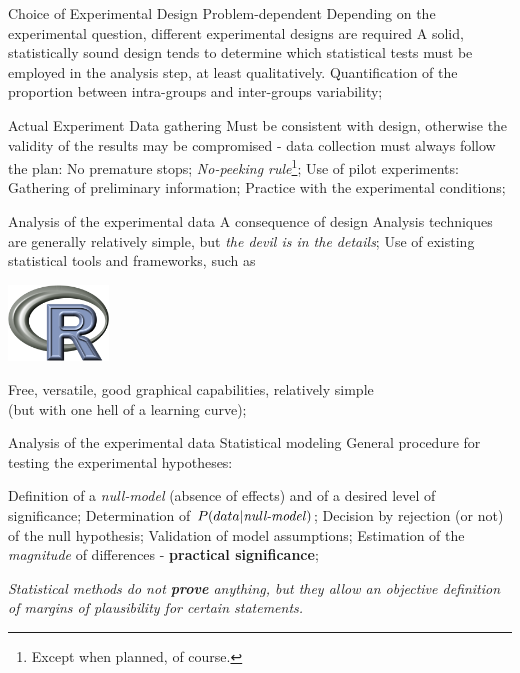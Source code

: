 \documentclass[t]{beamer}
\begin{document}

\begin{ftst}
{Choice of Experimental Design}
{Problem-dependent}
\bitems Depending on the experimental question, different experimental designs are required
	\spitem A solid, statistically sound design tends to determine which statistical tests must be employed in the analysis step, at least qualitatively.
	\spitem Quantification of the proportion between intra-groups and inter-groups variability;
\eitem
\end{ftst}

\begin{ftst}
{Actual Experiment}
{Data gathering}
\bitems Must be consistent with design, otherwise the validity of the results may be compromised - data collection must always follow the plan:\vhalf
	\bitems No premature stops;	
		\spitem\textit{No-peeking rule}\footnote[1]{Except when planned, of course.};
	\eitem
	\spitem Use of pilot experiments:\vhalf
	\bitems Gathering of preliminary information;
		\spitem Practice with the experimental conditions;
	\eitem
\eitem
\end{ftst}


\begin{ftst}
{Analysis of the experimental data}
{A consequence of design}
\bitems Analysis techniques are generally relatively simple, but \textit{the devil is in the details};
	\spitem Use of existing statistical tools and frameworks, such as
\eitem
\begin{center}
\includegraphics[width=0.2\textwidth]{../figs/rlogo.png}
\end{center}
\bitems Free, versatile, good graphical capabilities, relatively simple\\
(but with one hell of a learning curve);
\eitem
\end{ftst}


\begin{ftst}
{Analysis of the experimental data}
{Statistical modeling}
\bitems General procedure for testing the experimental hypotheses:

	\bitems Definition of a \textit{null-model} (absence of effects) and of a desired level of significance;
		\spitem Determination of $P(data|\mbox{\textit{null-model}})$;
		\spitem Decision by rejection (or not) of the null hypothesis;
		\spitem Validation of model assumptions;
		\spitem Estimation of the  \textit{magnitude} of differences - \textbf{practical significance};
	\eitem
\eitem

\begin{block}{}
	\centering\textit{Statistical methods do not \textbf{prove} anything, but they allow an objective definition of margins of plausibility for certain statements.}
\end{block}
\end{ftst}
\end{document}
